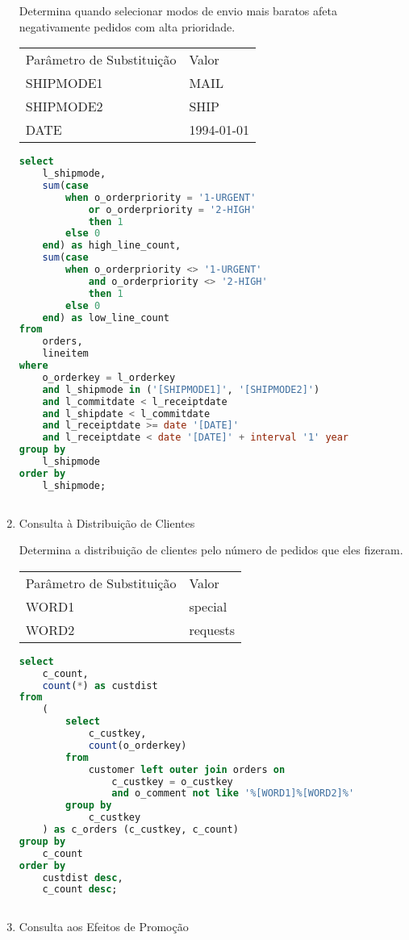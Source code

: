 \begin{enumerate}
    Determina quando selecionar modos de envio mais baratos afeta negativamente pedidos com alta prioridade.
    
\begin{tabular}{ll}
	Parâmetro de Substituição & Valor\\
	SHIPMODE1 & MAIL\\
	SHIPMODE2 & SHIP\\
	DATE & 1994-01-01 \\
\end{tabular}

	\begin{lstlisting}[language=SQL]
select
	l_shipmode,
	sum(case
		when o_orderpriority = '1-URGENT'
			or o_orderpriority = '2-HIGH'
			then 1
		else 0
	end) as high_line_count,
	sum(case
		when o_orderpriority <> '1-URGENT'
			and o_orderpriority <> '2-HIGH'
			then 1
		else 0
	end) as low_line_count
from
	orders,
	lineitem
where
	o_orderkey = l_orderkey
	and l_shipmode in ('[SHIPMODE1]', '[SHIPMODE2]')
	and l_commitdate < l_receiptdate
	and l_shipdate < l_commitdate
	and l_receiptdate >= date '[DATE]'
	and l_receiptdate < date '[DATE]' + interval '1' year
group by
	l_shipmode
order by
	l_shipmode;
	
	\end{lstlisting}
	
\item Consulta à Distribuição de Clientes

Determina a distribuição de clientes pelo número de pedidos que eles fizeram.

\begin{tabular}{ll}
	Parâmetro de Substituição & Valor\\
	WORD1 & special\\
	WORD2 & requests\\
\end{tabular}

	\begin{lstlisting}[language=SQL]
select
	c_count,
	count(*) as custdist
from
	(
		select
			c_custkey,
			count(o_orderkey)
		from
			customer left outer join orders on
				c_custkey = o_custkey
				and o_comment not like '%[WORD1]%[WORD2]%'
		group by
			c_custkey
	) as c_orders (c_custkey, c_count)
group by
	c_count
order by
	custdist desc,
	c_count desc;
	
	\end{lstlisting}

\item Consulta aos Efeitos de Promoção


\end{enumerate}
